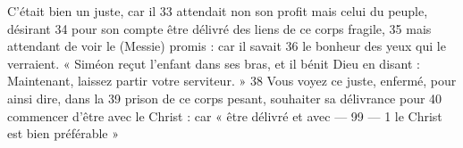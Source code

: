 C'était bien un juste, car il	 
33	 	attendait non son profit mais celui du peuple, désirant	 
34	 	pour son compte être délivré des liens de ce corps fragile,	 
35	 	mais attendant de voir le (Messie) promis : car il savait	 
36	 	le bonheur des yeux qui le verraient.
« Siméon reçut l’enfant dans ses bras, et il bénit Dieu en disant : Maintenant, laissez partir votre serviteur. »	 
38	 	Vous voyez ce juste, enfermé, pour ainsi dire, dans la	 
39	 	prison de ce corps pesant, souhaiter sa délivrance pour	 
40	 	commencer d'être avec le Christ : car « être délivré et avec	 
 	--- 99 ---	 
1	 	le Christ est bien préférable »